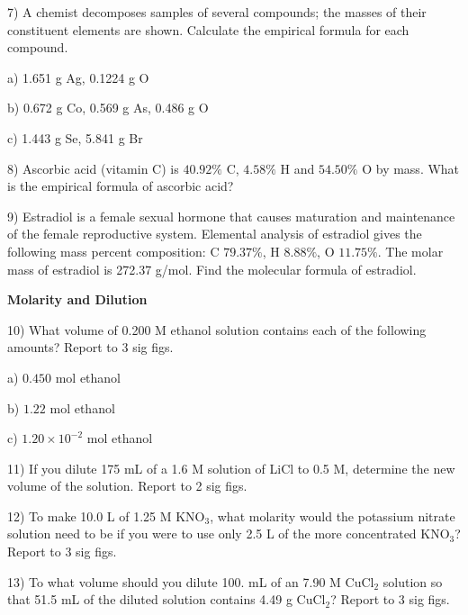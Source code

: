 \documentclass[12pt]{article}
\begin{document}
7) A chemist decomposes samples of several compounds; the masses of their constituent
elements are shown. Calculate the empirical formula for each compound.

a) 1.651 g Ag, 0.1224 g O

b) 0.672 g Co, 0.569 g As, 0.486 g O

c) 1.443 g Se, 5.841 g Br

\vspace{0.5in}

8) Ascorbic acid (vitamin C) is $40.92\%$ C, $4.58\%$ H and $54.50\%$ O by mass.
What is the empirical formula of ascorbic acid?

\vspace{0.5in}

9) Estradiol is a female sexual hormone that causes maturation and maintenance of the female
reproductive system. Elemental analysis of estradiol gives the following mass percent composition:
C $79.37\%$, H $8.88\%$, O $11.75\%$. The molar mass of estradiol is 272.37 g/mol. Find the
molecular formula of estradiol.

\vspace{0.5in}

\textbf{Molarity and Dilution}

10) What volume of 0.200 M ethanol solution contains each of the following amounts?
Report to 3 sig figs.

a) $0.450$ mol ethanol

b) $1.22$ mol ethanol

c) $1.20 \times 10^{-2}$ mol ethanol

\vspace{0.5in}

11) If you dilute 175 mL of a 1.6 M solution of LiCl to 0.5 M, determine the new volume of the
solution. Report to 2 sig figs.

\vspace{1in}

12) To make 10.0 L of 1.25 M KNO$_3$, what molarity would the potassium nitrate solution
need to be if you were to use only 2.5 L of the more concentrated KNO$_3$? Report to 3 sig figs.

\vspace{0.5in}

13) To what volume should you dilute 100. mL of an 7.90 M CuCl$_2$ solution so that 51.5 mL of
the diluted solution contains 4.49 g CuCl$_2$? Report to 3 sig figs.
\end{document}
